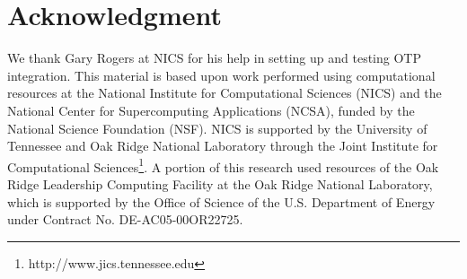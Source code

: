 \documentclass[AMA]{WileyNJD-v1}
\begin{document}
\section*{Acknowledgment}
We thank Gary Rogers at NICS for his help in setting up and testing OTP integration. This material is based upon work performed using computational resources at the National Institute for Computational Sciences (NICS) and the National Center for Supercomputing Applications (NCSA), funded by the National Science Foundation (NSF). NICS is supported by the University of Tennessee and Oak Ridge National Laboratory through the Joint Institute for Computational Sciences\footnote{http://www.jics.tennessee.edu}. A portion of this research used resources of the Oak Ridge Leadership Computing Facility at the Oak Ridge National Laboratory, which is supported by the Office of Science of the U.S. Department of Energy under Contract No. DE-AC05-00OR22725. 



\end{document}
